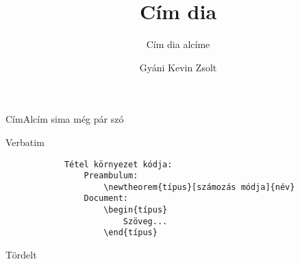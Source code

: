\documentclass[aspectratio=169, bigger, xcolor=table]{beamer}
\begin{document}
    \begin{frame}
        \author{Gyáni Kevin Zsolt}
        \title{Cím dia}
        \subtitle{Cím dia alcíme}
        
        \maketitle
    \end{frame}

    \begin{frame}{Cím}{Alcím}
        sima
        \newline
        még pár szó
    \end{frame}
    
    \begin{frame}[fragile]{Verbatim}
        \begin{verbatim}
            Tétel környezet kódja:
                Preambulum:
                    \newtheorem{típus}[számozás módja]{név}
                Document:
                    \begin{típus}
                        Szöveg...
                    \end{típus}
        \end{verbatim}
    \end{frame}
    
    \begin{frame}[allowframebreaks]{Tördelt}
        \lipsum[2-5]
    \end{frame}
    
\end{document}
